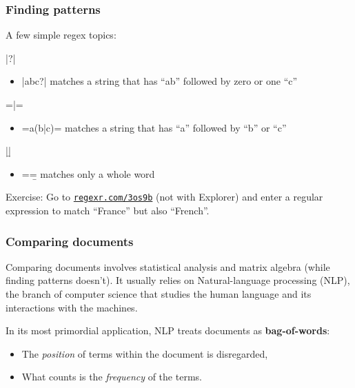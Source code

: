 \documentclass[serif, aspectratio=169]{beamer}
\begin{document}
\begin{frame}[fragile]
\frametitle{Finding patterns}

A few simple regex topics:

\begin{description}

\item<1->[Quantifier] \bverb|?|

\begin{itemize}

\item<2-> \bverb|abc?| matches a string that has \enquote{ab} followed by zero or one \enquote{c}

\end{itemize}

\item<3->[OR operator] \bverb=|=

\begin{itemize}

\item<4-> \bverb=a(b|c)= matches a string that has \enquote{a} followed by \enquote{b} or \enquote{c}

\end{itemize}

\item<5->[Boundaries]\bverb|\b|

\begin{itemize}

\item<6-> \bverb=\babc\b= matches only a whole word

\end{itemize}

\end{description}

{\footnotesize Exercise: Go to \texttt{\href{https://regexr.com/3os9b}{regexr.com/3os9b}} (not with Explorer) and enter a regular expression to match \enquote{France} but also \enquote{French}}.

\end{frame}

\begin{frame}
\frametitle{Comparing documents}

Comparing documents involves statistical analysis and matrix algebra (while finding patterns doesn't). It usually relies on Natural-language processing (NLP), the branch of computer science that studies the human language and its interactions with the machines. 

In its most primordial application, NLP treats documents as \textbf{bag-of-words}:
\begin{itemize}
\item  The \textit{position} of terms within the document is disregarded,
\item What counts is the \textit{frequency} of the terms.
\end{itemize}

\end{frame}
\end{document}
